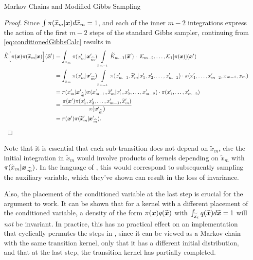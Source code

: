\begin{chapter}{Markov Chains and Modified Gibbs Sampling}
\begin{proof}
  Since  $\int\pi(\widetilde x_m|\mbox{\boldmath$x$})d\widetilde x_m = 1$, and each of the inner $m-2$ integrations express the action of the first $m-2$ steps of the standard Gibbs sampler, continuing from \eqref{eq:conditionedGibbsCalc} results in 
  \begin{align}
    \widetilde{\mathcal K}\Big[ \pi(\mbox{\boldmath$x$})\pi(\widetilde x_m|\mbox{\boldmath$x$})\Big](\widetilde{\mbox{\boldmath$x$}}')
      &= \int_{x_m}\pi(x_m'|\mbox{\boldmath$x$}_{\,\widehat{m}}') \int\limits_{x_{m-1}}\widetilde K_{m-1}(\widetilde{\mbox{\boldmath$x$}}')\,\cdot\,\mathcal K_{m-2},\dots,\mathcal K_{1}[\pi(\mbox{\boldmath$x$})](\mbox{\boldmath$x$}')\nonumber \\ 
      &= \int_{x_m}\pi(x_m'|\mbox{\boldmath$x$}_{\,\widehat{m}}') \int\limits_{x_{m-1}}\pi(x_{m-1}',\widetilde x_m'|x_1',x_2',\dots, x_{m-2}')\cdot\pi(x_1',\dots, x_{m-2}', x_{m-1},x_m)\nonumber \\ 
      &= \pi(x_m'|\mbox{\boldmath$x$}_{\,\widehat{m}}') \pi(x_{m-1}',\widetilde x_m'|x_1',x_2',\dots, x_{m-2}')\cdot\pi(x_1',\dots, x_{m-2}')\nonumber \\ 
      &= \frac{\pi(\mbox{\boldmath$x$}')\pi(x_1',x_2',\dots, x_{m-1}', \widetilde x_m')}{\pi(\mbox{\boldmath$x$}_{\,\widehat{m}}')}\nonumber \\ 
      &= \pi(\mbox{\boldmath$x$}')\pi(\widetilde x_m'|\mbox{\boldmath$x$}_{\,\widehat{m}}').
  \end{align}
\end{proof}

Note that it is essential that each sub-transition does not depend on $\tilde x_m$,  else the initial integration in $\tilde x_m$ would involve products of kernels depending on $\tilde x_m$ with $\pi(\widetilde x_m|\mbox{\boldmath$x$}_{\,\widehat{m}})$. %
In the language of \citep{van2008partially}, this would correspond to subsequently sampling the auxiliary variable, which they've shown can result in the loss of invariance.

Also, the placement of the conditioned variable at the last step is crucial for the argument to work.  
It can be shown that for a kernel with a different placement of the conditioned variable, a density of the form $\pi(\mbox{\boldmath$x$})q(\widetilde{\mbox{\boldmath$x$}})$ with $\int_{\widetilde x_i} q(\widetilde{\mbox{\boldmath$x$}})d\widetilde{\mbox{\boldmath$x$}} = 1$ will \emph{not} be invariant.
In practice, this has no practical effect on an implementation that cyclically permutes the steps in , since it can be viewed as a Markov chain with the same transition kernel, only that it has a different initial distribution, and that at the last step, the transition kernel has partially completed.


\end{chapter}

